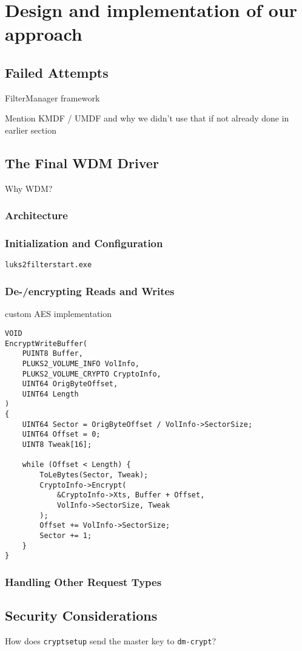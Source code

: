 \section{Design and implementation of our approach}

\subsection{Failed Attempts}
FilterManager framework

Mention KMDF / UMDF and why we didn't use that if not already done in earlier section

\subsection{The Final WDM Driver}
Why WDM?

\subsubsection{Architecture}

\subsubsection{Initialization and Configuration}
\texttt{luks2filterstart.exe}

\subsubsection{De-/encrypting Reads and Writes}
custom AES implementation

\begin{lstlisting}[style=CStyle]
VOID
EncryptWriteBuffer(
    PUINT8 Buffer,
    PLUKS2_VOLUME_INFO VolInfo,
    PLUKS2_VOLUME_CRYPTO CryptoInfo,
    UINT64 OrigByteOffset,
    UINT64 Length
)
{
    UINT64 Sector = OrigByteOffset / VolInfo->SectorSize;
    UINT64 Offset = 0;
    UINT8 Tweak[16];

    while (Offset < Length) {
        ToLeBytes(Sector, Tweak);
        CryptoInfo->Encrypt(
            &CryptoInfo->Xts, Buffer + Offset,
            VolInfo->SectorSize, Tweak
        );
        Offset += VolInfo->SectorSize;
        Sector += 1;
    }
}
\end{lstlisting}

\subsubsection{Handling Other Request Types}

\subsection{Security Considerations}
How does \texttt{cryptsetup} send the master key to \texttt{dm-crypt}?